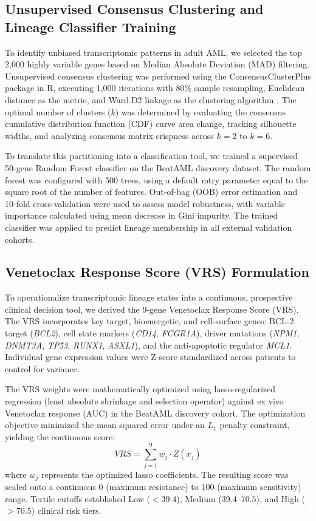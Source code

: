 \documentclass[11pt,a4paper]{article}
\begin{document}
\subsection{Unsupervised Consensus Clustering and Lineage Classifier Training}
To identify unbiased transcriptomic patterns in adult AML, we selected the top 2,000 highly variable genes based on Median Absolute Deviation (MAD) filtering. Unsupervised consensus clustering was performed using the ConsensusClusterPlus package in R, executing 1,000 iterations with 80\% sample resampling, Euclidean distance as the metric, and Ward.D2 linkage as the clustering algorithm \cite{wilkerson2010consensuscluster}. The optimal number of clusters ($k$) was determined by evaluating the consensus cumulative distribution function (CDF) curve area change, tracking silhouette widths, and analyzing consensus matrix crispness across $k=2$ to $k=6$.

To translate this partitioning into a classification tool, we trained a supervised 50-gene Random Forest classifier on the BeatAML discovery dataset. The random forest was configured with 500 trees, using a default mtry parameter equal to the square root of the number of features. Out-of-bag (OOB) error estimation and 10-fold cross-validation were used to assess model robustness, with variable importance calculated using mean decrease in Gini impurity. The trained classifier was applied to predict lineage membership in all external validation cohorts.

\subsection{Venetoclax Response Score (VRS) Formulation}
To operationalize transcriptomic lineage states into a continuous, prospective clinical decision tool, we derived the 9-gene Venetoclax Response Score (VRS). The VRS incorporates key target, bioenergetic, and cell-surface genes: BCL-2 target (\textit{BCL2}), cell state markers (\textit{CD14}, \textit{FCGR1A}), driver mutations (\textit{NPM1}, \textit{DNMT3A}, \textit{TP53}, \textit{RUNX1}, \textit{ASXL1}), and the anti-apoptotic regulator \textit{MCL1}. Individual gene expression values were Z-score standardized across patients to control for variance.

The VRS weights were mathematically optimized using lasso-regularized regression (least absolute shrinkage and selection operator) against ex vivo Venetoclax response (AUC) in the BeatAML discovery cohort. The optimization objective minimized the mean squared error under an $L_1$ penalty constraint, yielding the continuous score:
\begin{equation}
VRS = \sum_{j=1}^9 w_j \cdot Z(x_j)
\end{equation}
where $w_j$ represents the optimized lasso coefficients. The resulting score was scaled onto a continuous 0 (maximum resistance) to 100 (maximum sensitivity) range. Tertile cutoffs established Low ($<39.4$), Medium ($39.4$--$70.5$), and High ($>70.5$) clinical risk tiers.
\end{document}
